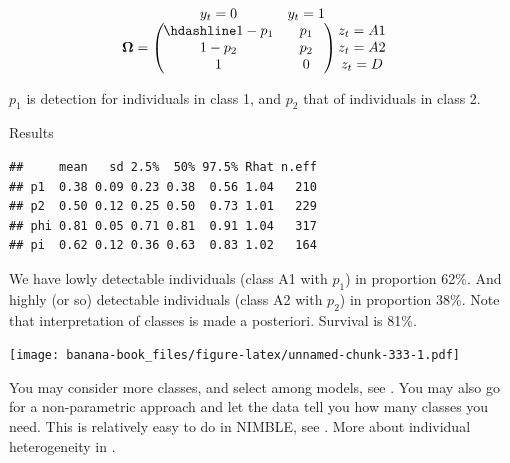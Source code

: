 \documentclass[
  12pt,
]{krantz}
\begin{document}
\[
  \begin{matrix}
& \\
\mathbf{\Omega} =
  \left ( \vphantom{ \begin{matrix} 12 \\ 12 \\ 12\end{matrix} } \right .
          \end{matrix}
          \hspace{-1.2em}
          \begin{matrix}
          y_t=0 & y_t=1\\ \hdashline
          1 - p_1 & p_1\\
          1 - p_2 & p_2\\
          1 & 0
          \end{matrix}
          \hspace{-0.2em}
          \begin{matrix}
          & \\
          \left . \vphantom{ \begin{matrix} 12 \\ 12 \\ 12\end{matrix} } \right )
\begin{matrix}
z_{t}=A1 \\ z_{t}=A2 \\ z_{t}=D
\end{matrix}
\end{matrix}
\]

\(p_1\) is detection for individuals in class 1, and \(p_2\) that of individuals in class 2.

Results

\begin{verbatim}
##     mean   sd 2.5%  50% 97.5% Rhat n.eff
## p1  0.38 0.09 0.23 0.38  0.56 1.04   210
## p2  0.50 0.12 0.25 0.50  0.73 1.01   229
## phi 0.81 0.05 0.71 0.81  0.91 1.04   317
## pi  0.62 0.12 0.36 0.63  0.83 1.02   164
\end{verbatim}

We have lowly detectable individuals (class A1 with \(p_1\)) in proportion 62\%. And highly (or so) detectable individuals (class A2 with \(p_2\)) in proportion 38\%. Note that interpretation of classes is made a posteriori. Survival is 81\%.

\texttt{[image: banana-book\_files/figure-latex/unnamed-chunk-333-1.pdf]}

You may consider more classes, and select among models, see \citet{cubaynes2012}. You may also go for a non-parametric approach and let the data tell you how many classes you need. This is relatively easy to do in NIMBLE, see \citet{turek_bayesian_2021}. More about individual heterogeneity in \citet{gimenez2018ih}.
\end{document}
